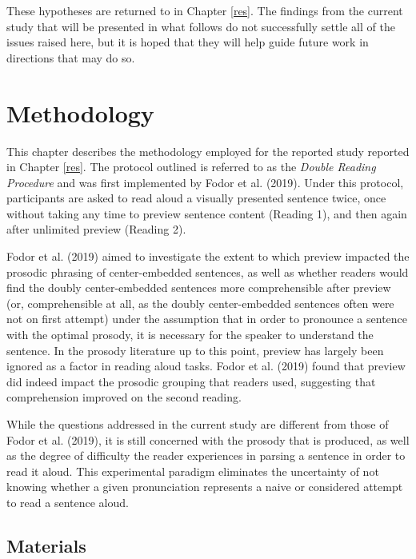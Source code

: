 \documentclass[11pt,oneside]{book}
\begin{document}
These hypotheses are returned to in Chapter \ref{res}. The findings from the current study that will be presented in what follows do not successfully settle all of the issues raised here, but it is hoped that they will help guide future work in directions that may do so.

\hypertarget{method}{%
\chapter{Methodology}\label{method}}

\setlength\parindent{24pt}\setlength{\parskip}{0.0pt plus 1.0pt}

This chapter describes the methodology employed for the reported study reported in Chapter \ref{res}. The protocol outlined is referred to as the \emph{Double Reading Procedure} and was first implemented by Fodor et al. (2019). Under this protocol, participants are asked to read aloud a visually presented sentence twice, once without taking any time to preview sentence content (Reading 1), and then again after unlimited preview (Reading 2).

Fodor et al. (2019) aimed to investigate the extent to which preview impacted the prosodic phrasing of center-embedded sentences, as well as whether readers would find the doubly center-embedded sentences more comprehensible after preview (or, comprehensible at all, as the doubly center-embedded sentences often were not on first attempt) under the assumption that in order to pronounce a sentence with the optimal prosody, it is necessary for the speaker to understand the sentence. In the prosody literature up to this point, preview has largely been ignored as a factor in reading aloud tasks. Fodor et al. (2019) found that preview did indeed impact the prosodic grouping that readers used, suggesting that comprehension improved on the second reading.

While the questions addressed in the current study are different from those of Fodor et al. (2019), it is still concerned with the prosody that is produced, as well as the degree of difficulty the reader experiences in parsing a sentence in order to read it aloud. This experimental paradigm eliminates the uncertainty of not knowing whether a given pronunciation represents a naive or considered attempt to read a sentence aloud.

\hypertarget{mat}{%
\section{Materials}\label{mat}}
\end{document}
